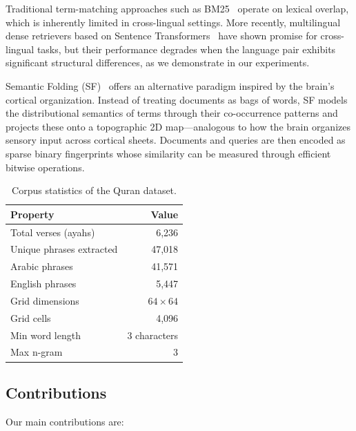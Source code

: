 \documentclass[conference]{IEEEtran}
\begin{document}
Traditional term-matching approaches such as BM25~\cite{robertson2009bm25}
operate on lexical overlap, which is inherently limited in cross-lingual
settings. More recently, multilingual dense retrievers based on Sentence
Transformers~\cite{reimers2019sentence} have shown promise for cross-
lingual tasks, but their performance degrades when the language pair
exhibits significant structural differences, as we demonstrate in our
experiments.

Semantic Folding (SF)~\cite{webber2018semantic} offers an alternative
paradigm inspired by the brain's cortical organization. Instead of
treating documents as bags of words, SF models the distributional
semantics of terms through their co-occurrence patterns and projects
these onto a topographic 2D map---analogous to how the brain organizes
sensory input across cortical sheets. Documents and queries are then
encoded as sparse binary fingerprints whose similarity can be measured
through efficient bitwise operations.

\begin{table}[h]
  \centering
  \caption{Corpus statistics of the Quran dataset.}
  \label{tab:corpus_stats}
  \begin{tabular}{lr}
    \toprule
    \textbf{Property} & \textbf{Value} \\
    \midrule
    Total verses (ayahs) & 6,236 \\
    Unique phrases extracted & 47,018 \\
    Arabic phrases & 41,571 \\
    English phrases & 5,447 \\
    Grid dimensions & $64 \times 64$ \\
    Grid cells & 4,096 \\
    Min word length & 3 characters \\
    Max n-gram & 3 \\
    \bottomrule
  \end{tabular}
\end{table}

\subsection{Contributions}

Our main contributions are:
\end{document}
